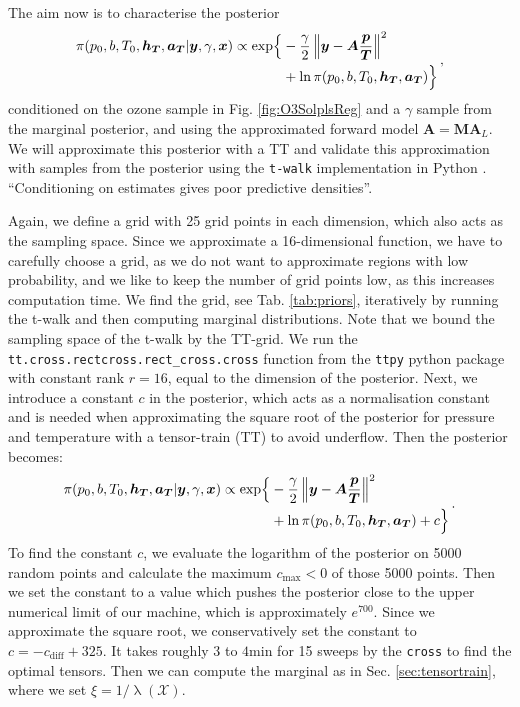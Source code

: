 The aim now is to characterise the posterior
\begin{align}
	\begin{split}
		\pi(p_0,b,T_0,\bm{h_T},\bm{a_T} | \bm{y}, \gamma, \bm{x}) \propto  \exp\Bigl\{ & -\frac{\gamma}{2} \left\Vert \bm{y}- \bm{A} \frac{\bm{p}}{\bm{T}}  \right\Vert^2 \\ &+ \ln{\pi(p_0,b,T_0,\bm{h_T},\bm{a_T}) \Bigr\}  }
	\end{split} \, ,
	\label{eq:postPT}
\end{align}
conditioned on the ozone sample in Fig. \ref{fig:O3SolplsReg} and a $\gamma$ sample from the marginal posterior, and using the approximated forward model $\bm{A} = \bm{M}\bm{A}_L$.
We will approximate this posterior with a TT and validate this approximation with samples from the posterior using the \texttt{t-walk} \cite{christen2010general} implementation in Python \cite{christentwalkaccess}.
“Conditioning
on estimates gives poor predictive densities”.
\cite{tan2016LecNot}

Again, we define a grid with 25 grid points in each dimension, which also acts as the sampling space.
Since we approximate a 16-dimensional function, we have to carefully choose a grid, as we do not want to approximate regions with low probability, and we like to keep the number of grid points low, as this increases computation time.
We find the grid, see Tab. \ref{tab:priors}, iteratively by running the t-walk and then computing marginal distributions.
Note that we bound the sampling space of the t-walk by the TT-grid.
We run the  \texttt{tt.cross.rectcross.rect\_cross.cross} function from the \texttt{ttpy} python package \cite{} with constant rank $r = 16$, equal to the dimension of the posterior.
Next, we introduce a constant $c$ in the posterior, which acts as a normalisation constant and is needed when approximating the square root of the posterior for pressure and temperature with a tensor-train (TT) to avoid underflow.
Then the posterior becomes:
\begin{align}
	\begin{split}
		\pi(p_0,b,T_0,\bm{h_T},\bm{a_T} | \bm{y}, \gamma, \bm{x}) \propto  \exp\Bigl\{ & -\frac{\gamma}{2} \left\Vert \bm{y}- \bm{A} \frac{\bm{p}}{\bm{T}}  \right\Vert^2 \\ &+ \ln{\pi(p_0,b,T_0,\bm{h_T},\bm{a_T}) + c \Bigr\}  }
	\end{split} \, .
	\label{eq:TTpostPT}
\end{align}
To find the constant $c$, we evaluate the logarithm of the posterior on 5000 random points and calculate the maximum $c_{\text{max}} < 0$ of those 5000 points.
Then we set the constant to a value which pushes the posterior close to the upper numerical limit of our machine, which is approximately $e ^{700}$.
Since we approximate the square root, we conservatively set the constant to $c = -c_{\text{diff}} + 325$.
It takes roughly $3$ to $4$min for 15 sweeps by the \texttt{cross} to find the optimal tensors.
Then we can compute the marginal as in Sec. \ref{sec:tensortrain}, where we set $\xi = 1 / \uplambda (\mathcal{X})$.

